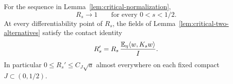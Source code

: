 \begin{proposition}
\label{prop:regularized-constants}
For the sequence in Lemma~\ref{lem:critical-normalization},
\begin{equation}\label{eq:critical-R-limit}
 R_s\longrightarrow1\qquad\text{for every }0<s<1/2.
\end{equation}
At every differentiability point of $R_s$, the fields of
Lemma~\ref{lem:critical-two-alternatives} satisfy the contact
identity
\begin{equation}\label{eq:critical-contact-derivative}
 R_s'=R_s\,\frac{\mathbb E_\eta\langle w,K_sw\rangle}{I}.
\end{equation}
In particular $0\le R_s'\le C_J\sqrt a$ almost everywhere
on each fixed compact $J\subset(0,1/2)$.
\end{proposition}

